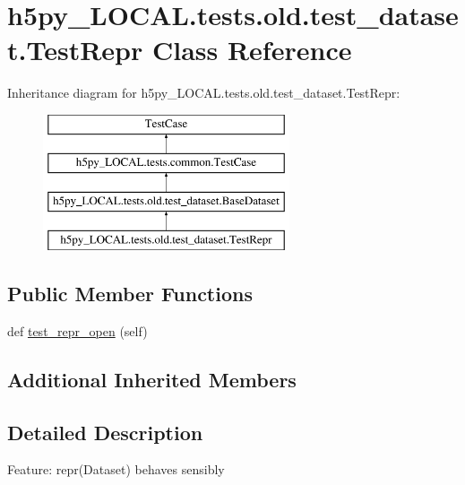 \hypertarget{classh5py__LOCAL_1_1tests_1_1old_1_1test__dataset_1_1TestRepr}{}\section{h5py\+\_\+\+L\+O\+C\+A\+L.\+tests.\+old.\+test\+\_\+dataset.\+Test\+Repr Class Reference}
\label{classh5py__LOCAL_1_1tests_1_1old_1_1test__dataset_1_1TestRepr}
Inheritance diagram for h5py\+\_\+\+L\+O\+C\+A\+L.\+tests.\+old.\+test\+\_\+dataset.\+Test\+Repr\+:\begin{figure}[H]
\begin{center}
\leavevmode
\includegraphics[height=4.000000cm]{classh5py__LOCAL_1_1tests_1_1old_1_1test__dataset_1_1TestRepr}
\end{center}
\end{figure}
\subsection*{Public Member Functions}
\begin{DoxyCompactItemize}
\item 
def \hyperlink{classh5py__LOCAL_1_1tests_1_1old_1_1test__dataset_1_1TestRepr_ad4b06a0bca67aa47b918e2e18d15cf98}{test\+\_\+repr\+\_\+open} (self)
\end{DoxyCompactItemize}
\subsection*{Additional Inherited Members}


\subsection{Detailed Description}
\begin{DoxyVerb}    Feature: repr(Dataset) behaves sensibly
\end{DoxyVerb}
 

